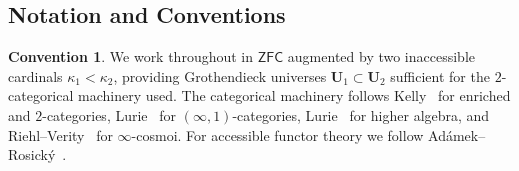 \documentclass[11pt]{article}
\theoremstyle{plain}
\theoremstyle{definition}
\newtheorem{convention}[theorem]{Convention}
\newcommand{\ZFC}{\mathsf{ZFC}}
\begin{document}
\subsection{Notation and Conventions}

\begin{convention}\label{conv:zfc-inacc}
We work throughout in $\ZFC$ augmented by two inaccessible cardinals $\kappa_1 < \kappa_2$, providing Grothendieck universes $\mathbf{U}_1 \subset \mathbf{U}_2$ sufficient for the $2$-categorical machinery used. The categorical machinery follows Kelly~\cite{Kelly1982} for enriched and $2$-categories, Lurie~\cite{LurieHTT} for $(\infty, 1)$-categories, Lurie~\cite{LurieHA} for higher algebra, and Riehl--Verity~\cite{RiehlVerity2022} for $\infty$-cosmoi. For accessible functor theory we follow Ad\'amek--Rosick\'y~\cite{AdamekRosicky1994}.
\end{convention}
\end{document}
